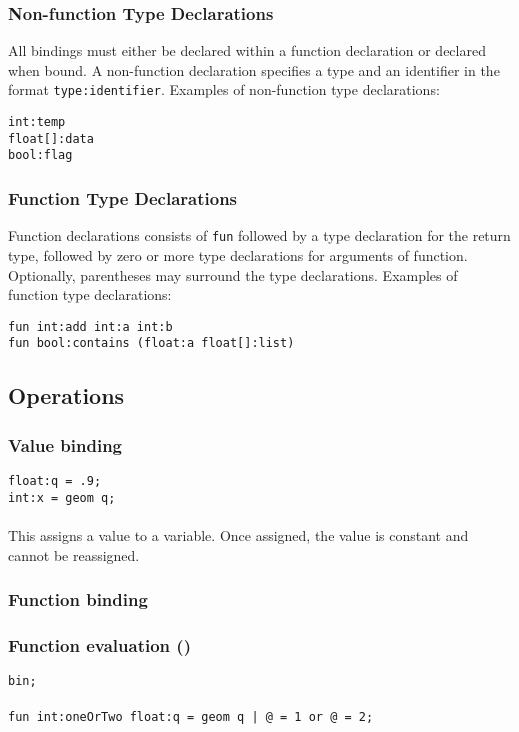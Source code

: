 \subsubsection{Non-function Type Declarations}
All bindings must either be declared within a function declaration or declared when bound. A non-function declaration specifies a type and an identifier in the format \texttt{type:identifier}.  Examples of non-function type declarations:

\texttt{int:temp}\\
\texttt{float[]:data}\\
\texttt{bool:flag}

\subsubsection{Function Type Declarations}

Function declarations consists of \texttt{fun} followed by a type declaration for the return type, followed by zero or more type declarations for arguments of function. Optionally, parentheses may surround the type declarations. Examples of function type declarations: 

\texttt{fun int:add int:a int:b}\\
\texttt{fun bool:contains (float:a float[]:list)}

\subsection{Operations}

\subsubsection{Value binding}
\texttt{float:q = .9;}\\
\texttt{int:x = \midtilde geom q;}\\
\\
This assigns a value to a variable. Once assigned, the value is constant and cannot be reassigned.

\subsubsection{Function binding}

\subsubsection{Function evaluation (\texttt{\midtilde})}
\texttt{\midtilde bin;}\\
\\
\texttt{fun int:oneOrTwo float:q = geom q | @ = 1 or @ = 2;}\\

